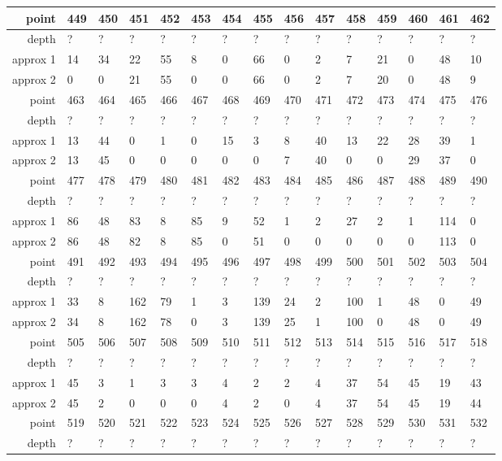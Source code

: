 \begin{center}
\begin{supertabular}{|r|l l l l l l l l l l l l l l|}
\hline
point & 449 & 450 & 451 & 452 & 453 & 454 & 455 & 456 & 457 & 458 & 459 & 460 & 461 & 462 \\
\hline
depth & ? & ? & ? & ? & ? & ? & ? & ? & ? & ? & ? & ? & ? & ? \\
approx 1 & 14 & 34 & 22 & 55 & 8 & 0 & 66 & 0 & 2 & 7 & 21 & 0 & 48 & 10 \\
approx 2 & 0 & 0 & 21 & 55 & 0 & 0 & 66 & 0 & 2 & 7 & 20 & 0 & 48 & 9 \\
\hline
point & 463 & 464 & 465 & 466 & 467 & 468 & 469 & 470 & 471 & 472 & 473 & 474 & 475 & 476 \\
\hline
depth & ? & ? & ? & ? & ? & ? & ? & ? & ? & ? & ? & ? & ? & ? \\
approx 1 & 13 & 44 & 0 & 1 & 0 & 15 & 3 & 8 & 40 & 13 & 22 & 28 & 39 & 1 \\
approx 2 & 13 & 45 & 0 & 0 & 0 & 0 & 0 & 7 & 40 & 0 & 0 & 29 & 37 & 0 \\
\hline
point & 477 & 478 & 479 & 480 & 481 & 482 & 483 & 484 & 485 & 486 & 487 & 488 & 489 & 490 \\
\hline
depth & ? & ? & ? & ? & ? & ? & ? & ? & ? & ? & ? & ? & ? & ? \\
approx 1 & 86 & 48 & 83 & 8 & 85 & 9 & 52 & 1 & 2 & 27 & 2 & 1 & 114 & 0 \\
approx 2 & 86 & 48 & 82 & 8 & 85 & 0 & 51 & 0 & 0 & 0 & 0 & 0 & 113 & 0 \\
\hline
point & 491 & 492 & 493 & 494 & 495 & 496 & 497 & 498 & 499 & 500 & 501 & 502 & 503 & 504 \\
\hline
depth & ? & ? & ? & ? & ? & ? & ? & ? & ? & ? & ? & ? & ? & ? \\
approx 1 & 33 & 8 & 162 & 79 & 1 & 3 & 139 & 24 & 2 & 100 & 1 & 48 & 0 & 49 \\
approx 2 & 34 & 8 & 162 & 78 & 0 & 3 & 139 & 25 & 1 & 100 & 0 & 48 & 0 & 49 \\
\hline
point & 505 & 506 & 507 & 508 & 509 & 510 & 511 & 512 & 513 & 514 & 515 & 516 & 517 & 518 \\
\hline
depth & ? & ? & ? & ? & ? & ? & ? & ? & ? & ? & ? & ? & ? & ? \\
approx 1 & 45 & 3 & 1 & 3 & 3 & 4 & 2 & 2 & 4 & 37 & 54 & 45 & 19 & 43 \\
approx 2 & 45 & 2 & 0 & 0 & 0 & 4 & 2 & 0 & 4 & 37 & 54 & 45 & 19 & 44 \\
\hline
point & 519 & 520 & 521 & 522 & 523 & 524 & 525 & 526 & 527 & 528 & 529 & 530 & 531 & 532 \\
\hline
depth & ? & ? & ? & ? & ? & ? & ? & ? & ? & ? & ? & ? & ? & ? \\

\end{supertabular}
\end{center}
